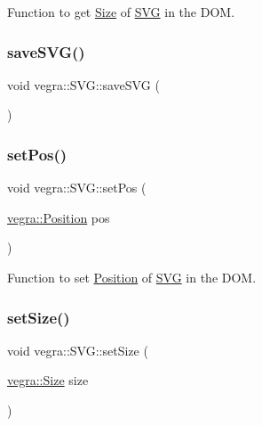 Function to get \mbox{\hyperlink{structvegra_1_1Size}{Size}} of \mbox{\hyperlink{structvegra_1_1SVG}{S\+VG}} in the D\+OM. 

\mbox{\label{structvegra_1_1SVG_a739917fb674392c8a92ce56c609daf9c}} 
\subsubsection{\texorpdfstring{save\+S\+V\+G()}{saveSVG()}}
{\footnotesize\ttfamily void vegra\+::\+S\+V\+G\+::save\+S\+VG (\begin{DoxyParamCaption}{ }\end{DoxyParamCaption})\hspace{0.3cm}{\ttfamily [inline]}}

\mbox{\label{structvegra_1_1SVG_a6468964d098acbdd91da3cac55e6f6b8}} 
\subsubsection{\texorpdfstring{set\+Pos()}{setPos()}}
{\footnotesize\ttfamily void vegra\+::\+S\+V\+G\+::set\+Pos (\begin{DoxyParamCaption}\item[{\mbox{\hyperlink{structvegra_1_1Position}{vegra\+::\+Position}}}]{pos }\end{DoxyParamCaption})\hspace{0.3cm}{\ttfamily [inline]}}



Function to set \mbox{\hyperlink{structvegra_1_1Position}{Position}} of \mbox{\hyperlink{structvegra_1_1SVG}{S\+VG}} in the D\+OM. 

\mbox{\label{structvegra_1_1SVG_ad80b2990559293806eeb8223bb7a8dc4}} 
\subsubsection{\texorpdfstring{set\+Size()}{setSize()}}
{\footnotesize\ttfamily void vegra\+::\+S\+V\+G\+::set\+Size (\begin{DoxyParamCaption}\item[{\mbox{\hyperlink{structvegra_1_1Size}{vegra\+::\+Size}}}]{size }\end{DoxyParamCaption})\hspace{0.3cm}{\ttfamily [inline]}}




